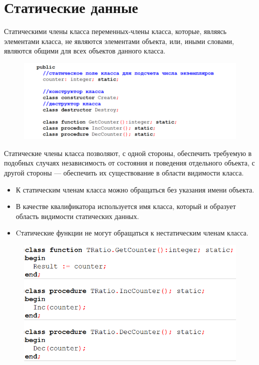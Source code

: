 \documentclass{beamer}
\begin{document}
\section{Статические данные}
\begin{frame}
\begin{block}{Статическими члены класса}
переменных-члены класса, которые, являясь элементами класса, не являются элементами объекта, или, иными словами, являются общими для всех объектов данного класса.
\end{block}
\begin{figure}[h]
\centering
\includegraphics[scale=0.4]{images/lec05-pic13.png}
\end{figure}
Статические члены класса позволяют, с одной стороны, обеспечить требуемую в подобных случаях независимость от состояния и поведения отдельного объекта, с другой стороны — обеспечить их существование в области видимости класса.
\end{frame}

\begin{frame}
\begin{itemize}
\item К статическим членам класса можно обращаться без указания имени объекта.
\item В качестве квалификатора используется имя класса, который и образует область видимости статических данных.
\item Cтатические функции не могут обращаться к нестатическим членам класса.
\end{itemize}
\begin{figure}[h]
\centering
\includegraphics[scale=0.4]{images/lec05-pic14.png}
\end{figure}
\end{frame}
\end{document}
